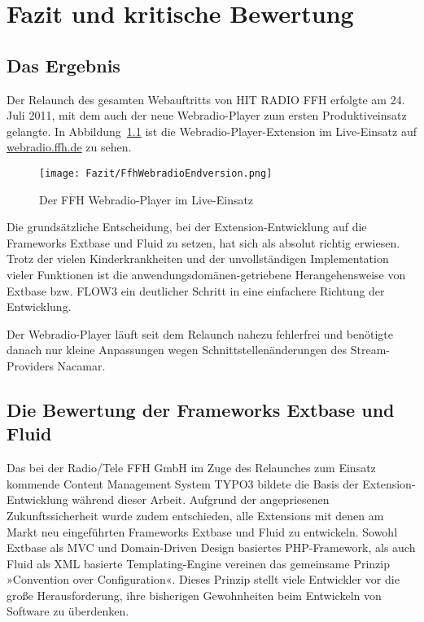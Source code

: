 \chapter{Fazit und kritische Bewertung}
\label{cha:Fazit}


\section{Das Ergebnis}
\label{sec:Ergebnis}

Der Relaunch des gesamten Webauftritts von HIT RADIO FFH erfolgte am 24.\,Juli 2011, mit dem auch der neue Webradio-Player zum ersten Produktiveinsatz gelangte. In Abbildung~\ref{fig:FfhWebradioEndversion} ist die Webradio-Player-Extension im Live-Einsatz auf \href{http://webradio.ffh.de/}{webradio.ffh.de} zu sehen. 

\begin{figure}[htbp]
	\begin{center}
		\texttt{[image: Fazit/FfhWebradioEndversion.png]}
		\caption[FFH Webradio-Player im Live-Einsatz]{Der FFH Webradio-Player im Live-Einsatz}
		\label{fig:FfhWebradioEndversion}
	\end{center}
\end{figure}

Die grunds\"atzliche Entscheidung, bei der Extension-Entwicklung auf die Frame\-works Extbase und Fluid zu setzen, hat sich als absolut richtig erwiesen. Trotz der vielen Kinderkrankheiten und der unvollst\"andigen Implementation vieler Funktionen ist die anwendungsdom\"anen-getriebene Herangehensweise von Extbase bzw. FLOW3 ein deutlicher Schritt in eine einfachere Richtung der Entwicklung. 

Der Webradio-Player l\"auft seit dem Relaunch nahezu fehlerfrei und ben\"otigte danach nur kleine Anpassungen wegen Schnittstellen\"anderungen des Stream-Providers Nacamar.


\newpage

\section{Die Bewertung der Frameworks Extbase und Fluid}
\label{sec:BewertungFrameworks}


Das bei der Radio/Tele FFH GmbH im Zuge des Relaunches zum Einsatz kommende Content Management System TYPO3 bildete die Basis der Extension-Entwicklung w\"ahrend dieser Arbeit. Aufgrund der angepriesenen Zukunftssicherheit wurde zudem entschieden, alle Extensions mit denen am Markt neu eingef\"uhrten Frameworks Extbase und Fluid zu entwickeln. Sowohl Extbase als MVC und Domain-Driven Design basiertes PHP-Framework, als auch Fluid als XML basierte Templating-Engine vereinen das gemeinsame Prinzip »Convention over Configuration«. Dieses Prinzip stellt viele Entwickler vor die gro{\ss}e Herausforderung, ihre bisherigen Gewohnheiten beim Entwickeln von Software zu \"uberdenken.

